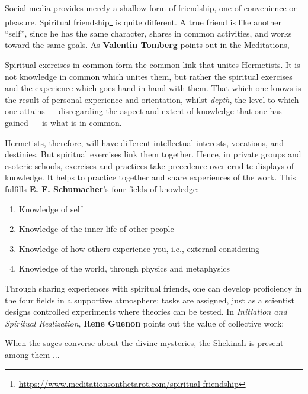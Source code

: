 Social media provides merely a shallow form of friendship, one of convenience or pleasure. Spiritual friendship\footnote{\url{https://www.meditationsonthetarot.com/spiritual-friendship}} is quite different. A true friend is like another ``self'', since he has the same character, shares in common activities, and works toward the same goals. As \textbf{Valentin Tomberg} points out in the Meditations,

\begin{quotex}
Spiritual exercises in common form the common link that unites Hermetists. It is not knowledge in common which unites them, but rather the spiritual exercises and the experience which goes hand in hand with them. That which one knows is the result of personal experience and orientation, whilst \emph{depth}, the level to which one attains --- disregarding the aspect and extent of knowledge that one has gained --- is what is in common.
\end{quotex}


Hermetists, therefore, will have different intellectual interests, vocations, and destinies. But spiritual exercises link them together. Hence, in private groups and esoteric schools, exercises and practices take precedence over erudite displays of knowledge. It helps to practice together and share experiences of the work. This fulfills \textbf{E. F. Schumacher}'s four fields of knowledge:

\begin{enumerate}


\item Knowledge of self

\item Knowledge of the inner life of other people

\item Knowledge of how others experience you, i.e., external considering

\item Knowledge of the world, through physics and metaphysics
\end{enumerate}


Through sharing experiences with spiritual friends, one can develop proficiency in the four fields in a supportive atmosphere; tasks are assigned, just as a scientist designs controlled experiments where theories can be tested. In \emph{Initiation and Spiritual Realization}, \textbf{Rene Guenon} points out the value of collective work:

\begin{quotex}
When the sages converse about the divine mysteries, the Shekinah is present among them ... 
\end{quotex}


